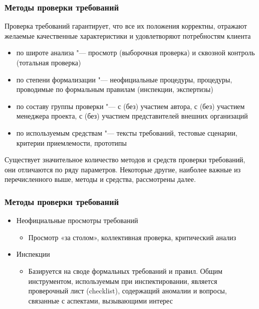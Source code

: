 \documentclass{../industrial-development}
\begin{document}
{\begin{frame} \frametitle {Методы проверки требований}
  \begin{block}{}
\alert{Проверка требований} гарантирует, что все их положения корректны, отражают желаемые качественные характеристики и удовлетворяют потребностям клиента
  \end{block}
\begin{itemize}
\item \alert{по широте анализа} "--- просмотр (выборочная проверка) и сквозной контроль (тотальная проверка)
\item \alert{по степени формализации} "--- неофициальные процедуры, процедуры, проводимые по формальным правилам (инспекции, экспертизы)
\item \alert{по составу группы проверки} "--- с (без) участием автора, с (без) участием менеджера проекта, с (без) участием представителей внешних организаций
\item \alert{по используемым средствам} "--- тексты требований, тестовые сценарии, критерии приемлемости, прототипы

\end{itemize}
\end{frame}

\lecturenotes

Существует значительное количество методов и средств проверки требований, они отличаются по ряду параметров. Некоторые другие, наиболее важные из перечисленного выше, методы и средства, рассмотрены далее.


\begin{frame} \frametitle {Методы проверки требований}

\begin{itemize}
\item \alert{Неофициальные просмотры требований}
\begin{itemize}
\item Просмотр «за столом», коллективная проверка, критический анализ
\end{itemize}

\item  \alert{Инспекции}
\begin{itemize}
\item Базируется на своде формальных требований и правил. Общим инструментом, используемым при инспектировании, является проверочный лист (checklist), содержащий аномалии и вопросы, связанные с аспектами, вызывающими интерес
\end{itemize}


\end{itemize}
\end{frame}}
\end{document}
